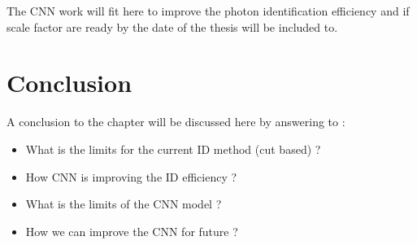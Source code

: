 The CNN work will fit here to improve the photon identification efficiency and if scale factor are ready by the date of the thesis will be included to.

\section{Conclusion}
\label{gamma:conc}

A conclusion to the chapter will be discussed here by answering to :

\begin{itemize}
    \item What is the limits for the current ID method (cut based) ?
    \item How CNN is improving the ID efficiency ?
    \item What is the limits of the CNN model ?
    \item How we can improve the CNN for future ?
\end{itemize}